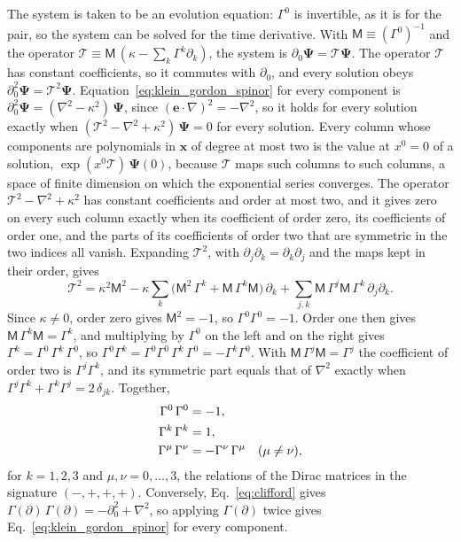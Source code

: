 \documentclass[aps,prd,onecolumn,tightenlines,nofootinbib,notitlepage,11pt,floatfix]{revtex4-2}
\theoremstyle{indentedtheorem}
\begin{document}
The system is taken to be an evolution equation: $\Gamma^0$ is invertible, as it is for the pair, so the system can be solved for the time derivative. With $\mathsf{M}\equiv(\Gamma^0)^{-1}$ and the operator $\mathcal{T}\equiv \mathsf{M}\,(\kappa-\sum_k\Gamma^k\partial_k)$, the system is $\partial_0\boldsymbol{\Psi}=\mathcal{T}\boldsymbol{\Psi}$. The operator $\mathcal{T}$ has constant coefficients, so it commutes with $\partial_0$, and every solution obeys $\partial_0^2\boldsymbol{\Psi}=\mathcal{T}^2\boldsymbol{\Psi}$. Equation~\eqref{eq:klein_gordon_spinor} for every component is $\partial_0^2\boldsymbol{\Psi}=(\nabla^2-\kappa^2)\,\boldsymbol{\Psi}$, since $(\mathbf{e}\cdot\nabla)^2=-\nabla^2$, so it holds for every solution exactly when $(\mathcal{T}^2-\nabla^2+\kappa^2)\,\boldsymbol{\Psi}=0$ for every solution. Every column whose components are polynomials in $\mathbf{x}$ of degree at most two is the value at $x^0=0$ of a solution, $\exp(x^0\mathcal{T})\,\boldsymbol{\Psi}(0)$, because $\mathcal{T}$ maps such columns to such columns, a space of finite dimension on which the exponential series converges. The operator $\mathcal{T}^2-\nabla^2+\kappa^2$ has constant coefficients and order at most two, and it gives zero on every such column exactly when its coefficient of order zero, its coefficients of order one, and the parts of its coefficients of order two that are symmetric in the two indices all vanish. Expanding $\mathcal{T}^2$, with $\partial_j\partial_k=\partial_k\partial_j$ and the maps kept in their order, gives
\begin{equation}
    \mathcal{T}^2 = \kappa^2\mathsf{M}^2 - \kappa\sum_k\big(\mathsf{M}^2\,\Gamma^k+\mathsf{M}\,\Gamma^k\mathsf{M}\big)\,\partial_k + \sum_{j,k}\mathsf{M}\,\Gamma^j\mathsf{M}\,\Gamma^k\,\partial_j\partial_k .
    \label{eq:evolution_square}
\end{equation}
Since $\kappa\neq0$, order zero gives $\mathsf{M}^2=-1$, so $\Gamma^0\Gamma^0=-1$. Order one then gives $\mathsf{M}\,\Gamma^k\mathsf{M}=\Gamma^k$, and multiplying by $\Gamma^0$ on the left and on the right gives $\Gamma^k=\Gamma^0\,\Gamma^k\,\Gamma^0$, so $\Gamma^0\Gamma^k=\Gamma^0\Gamma^0\,\Gamma^k\,\Gamma^0=-\Gamma^k\Gamma^0$. With $\mathsf{M}\,\Gamma^j\mathsf{M}=\Gamma^j$ the coefficient of order two is $\Gamma^j\Gamma^k$, and its symmetric part equals that of $\nabla^2$ exactly when $\Gamma^j\Gamma^k+\Gamma^k\Gamma^j=2\,\delta_{jk}$. Together,
\begin{align}
    \Gamma^0\,\Gamma^0 &= -1 , \notag\\
    \Gamma^k\,\Gamma^k &= 1 , \notag\\
    \Gamma^\mu\,\Gamma^\nu &= -\Gamma^\nu\,\Gamma^\mu \quad (\mu\neq\nu) ,
    \label{eq:clifford}
\end{align}
for $k=1,2,3$ and $\mu,\nu=0,\ldots,3$, the relations of the Dirac matrices in the signature $(-,+,+,+)$. Conversely, Eq.~\eqref{eq:clifford} gives $\Gamma(\partial)\,\Gamma(\partial)=-\partial_0^2+\nabla^2$, so applying $\Gamma(\partial)$ twice gives Eq.~\eqref{eq:klein_gordon_spinor} for every component.
\end{document}
